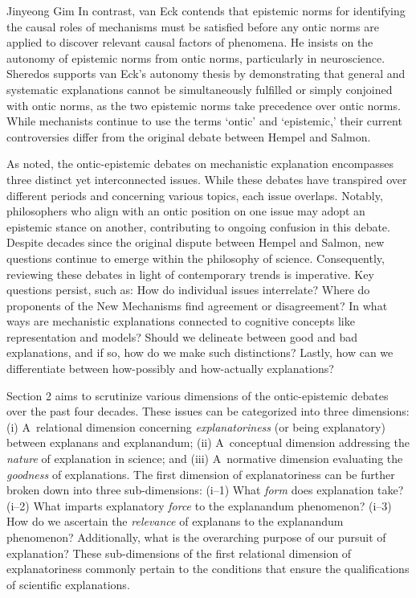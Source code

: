 \begin{artengenv}{Jinyeong Gim}
In contrast, van Eck
\parencite*[][]{van_eck_reconciling_2015} %
 contends that epistemic norms for identifying the causal roles of mechanisms must be satisfied before any ontic norms are applied to discover relevant causal factors of phenomena. He insists on the autonomy of epistemic norms from ontic norms, particularly in neuroscience. Sheredos 
\parencite*[][]{sheredos_re-reconciling_2016} %
 supports van Eck's autonomy thesis by demonstrating that general and systematic explanations cannot be simultaneously fulfilled or simply conjoined with ontic norms, as the two epistemic norms take precedence over ontic norms. While mechanists continue to use the terms ‘ontic' and ‘epistemic,' their current controversies differ from the original debate between Hempel and Salmon.

As noted, the ontic-epistemic debates on mechanistic explanation encompasses three distinct yet interconnected issues. While these debates have transpired over different periods and concerning various topics, each issue overlaps. Notably, philosophers who align with an ontic position on one issue may adopt an epistemic stance on another, contributing to ongoing confusion in this debate. Despite decades since the original dispute between Hempel and Salmon, new questions continue to emerge within the philosophy of science. Consequently, reviewing these debates in light of contemporary trends is imperative. Key questions persist, such as: How do individual issues interrelate? Where do proponents of the New Mechanisms find agreement or disagreement? In what ways are mechanistic explanations connected to cognitive concepts like representation and models? Should we delineate between good and bad explanations, and if so, how do we make such distinctions? Lastly, how can we differentiate between how-possibly and how-actually explanations?

Section 2 aims to scrutinize various dimensions of the ontic-epistemic debates over the past four decades. These issues can be categorized into three dimensions: (i) A~relational dimension concerning \textit{explanatoriness} (or being explanatory) between explanans and explanandum; (ii) A~conceptual dimension addressing the \textit{nature} of explanation in science; and (iii) A~normative dimension evaluating the \textit{goodness} of explanations. The first dimension of explanatoriness can be further broken down into three sub-dimensions: (i--1) What \textit{form} does explanation take? (i--2) What imparts explanatory \textit{force} to the explanandum phenomenon? (i--3) How do we ascertain the \textit{relevance} of explanans to the explanandum phenomenon? Additionally, what is the overarching purpose of our pursuit of explanation? These sub-dimensions of the first relational dimension of explanatoriness commonly pertain to the conditions that ensure the qualifications of scientific explanations.


\end{artengenv}
